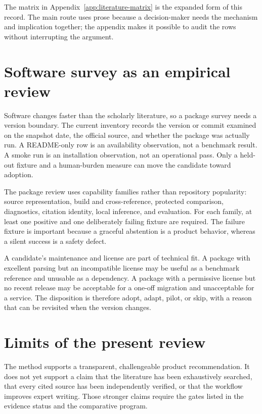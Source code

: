 The matrix in Appendix~\ref{app:literature-matrix} is the expanded form of
this record. The main route uses prose because a decision-maker needs the
mechanism and implication together; the appendix makes it possible to audit
the rows without interrupting the argument.

\section{Software survey as an empirical review}
\label{sec:method-software}

Software changes faster than the scholarly literature, so a package survey
needs a version boundary. The current inventory records the version or commit
examined on the snapshot date, the official source, and whether the package
was actually run. A README-only row is an availability observation, not a
benchmark result. A smoke run is an installation observation, not an
operational pass. Only a held-out fixture and a human-burden measure can move
the candidate toward adoption.

The package review uses capability families rather than repository popularity:
source representation, build and cross-reference, protected comparison,
diagnostics, citation identity, local inference, and evaluation. For each
family, at least one positive and one deliberately failing fixture are
required. The failure fixture is important because a graceful abstention is a
product behavior, whereas a silent success is a safety defect.

A candidate's maintenance and license are part of technical fit. A package
with excellent parsing but an incompatible license may be useful as a
benchmark reference and unusable as a dependency. A package with a permissive
license but no recent release may be acceptable for a one-off migration and
unacceptable for a service. The disposition is therefore adopt, adapt, pilot,
or skip, with a reason that can be revisited when the version changes.

\section{Limits of the present review}
\label{sec:method-limits}

The method supports a transparent, challengeable product recommendation. It
does not yet support a claim that the literature has been exhaustively
searched, that every cited source has been independently verified, or that the
workflow improves expert writing. Those stronger claims require the gates
listed in the evidence status and the comparative program.

